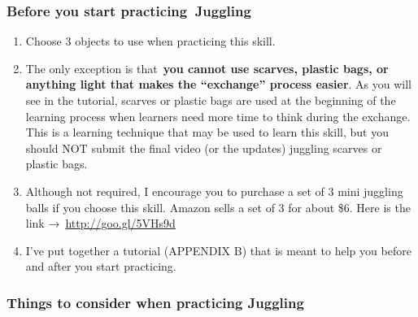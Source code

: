 \documentclass[
  letterpaper,
  DIV=11,
  numbers=noendperiod]{scrartcl}
\begin{document}
\hypertarget{before-you-start-practicing-juggling}{%
\subsubsection{\texorpdfstring{Before you start
practicing~\textbf{Juggling}}{Before you start practicing~Juggling}}\label{before-you-start-practicing-juggling}}

\begin{enumerate}
\def\labelenumi{\arabic{enumi}.}
\item
  Choose 3 objects to use when practicing this skill.
\item
  The only exception is that~\textbf{you cannot use scarves, plastic
  bags, or anything light that makes the ``exchange'' process easier}.
  As you will see in the tutorial, scarves or plastic bags are used at
  the beginning of the learning process when learners need more time to
  think during the exchange. This is a learning technique that may be
  used to learn this skill, but you should NOT submit the final video
  (or the updates) juggling scarves or plastic bags.~~
\item
  Although not required, I encourage you to purchase a set of 3 mini
  juggling balls if you choose this skill. Amazon sells a set of 3 for
  about \$6. Here is the link →~\url{http://goo.gl/5VHs9d}
\item
  I've put together a tutorial (APPENDIX B) that is meant to help you
  before and after you start practicing.
\end{enumerate}

\hypertarget{things-to-consider-when-practicing-juggling}{%
\subsubsection{\texorpdfstring{Things to consider when practicing
\textbf{Juggling}}{Things to consider when practicing Juggling}}\label{things-to-consider-when-practicing-juggling}}
\end{document}
